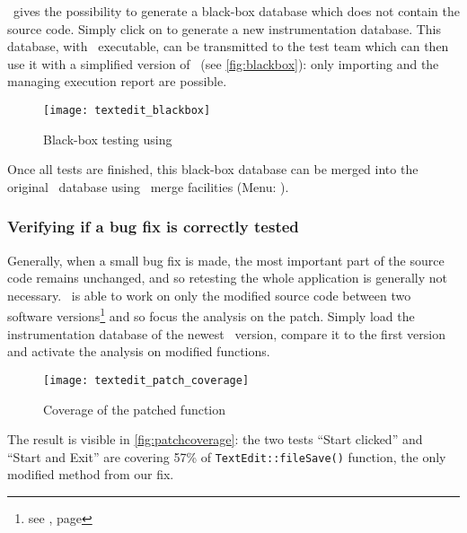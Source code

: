 \TestCocoon\ gives the possibility to generate a
black-box database which does not contain the source code. 
Simply click on  to
generate a new instrumentation database. This database, with \TextEdit\
executable, can be transmitted to the test team which can then use it with a
simplified version of \CoverageBrowser\ (see \autoref{fig:blackbox}): only
importing and the managing execution report are possible.

\begin{figure}[h]
  \begin{center}
    \texttt{[image: textedit\_blackbox]}
  \end{center}
  \caption{Black-box testing using \CoverageBrowser}
  \label{fig:blackbox}
\end{figure}


Once all tests are  finished, this black-box database can be merged into the original
\TextEdit\ database using \CoverageBrowser\ merge facilities (Menu:
\GUIMenuTwo{File}{Merge width\ldots}).

\subsubsection{Verifying if a bug fix is correctly tested}

Generally, when a small bug fix is made, the most important part of the source
code remains unchanged, and so retesting the whole application is generally not
necessary. \TestCocoon\ is able to work on only the modified source code
between two software versions\footnote{see \nameref{sec:patchimpact}, page
\pageref{sec:patchimpact}} and so focus the analysis on the patch. Simply
load the instrumentation database of the newest \TextEdit\ version, compare it
to the first version and activate the analysis on modified functions.

\begin{figure}[h]
  \begin{center}
    \texttt{[image: textedit\_patch\_coverage]}
  \end{center}
  \caption{Coverage of the patched function}
  \label{fig:patchcoverage}
\end{figure}

The result is visible in \autoref{fig:patchcoverage}: the two tests ``Start
clicked'' and ``Start and Exit'' are covering 57\% of
\verb$TextEdit::fileSave()$ function, the only modified method from our fix.

